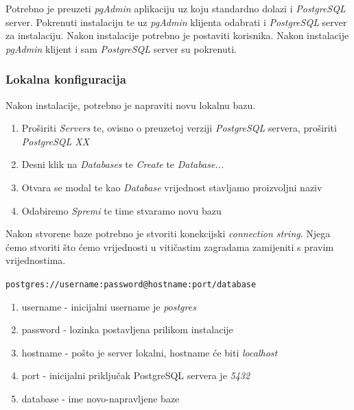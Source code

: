 								Potrebno je preuzeti \textit{pgAdmin} aplikaciju uz koju standardno dolazi i \textit{PostgreSQL} server. Pokrenuti instalaciju te uz \textit{pgAdmin} klijenta odabrati i \textit{PostgreSQL} server za instalaciju. Nakon instalacije potrebno je postaviti korisnika. Nakon instalacije \textit{pgAdmin} klijent i sam \textit{PostgreSQL} server su pokrenuti.
								
						\subsubsection*{Lokalna konfiguracija}
								
								Nakon instalacije, potrebno je napraviti novu lokalnu bazu.
								
								\begin{enumerate}
										\item Proširiti \textit{Servers} te, ovisno o preuzetoj verziji \textit{PostgreSQL} servera, proširiti  \textit{PostgreSQL XX}
										\item Desni klik na \textit{Databases} te \textit{Create} te \textit{Database...}
										\item Otvara se modal te kao \textit{Database} vrijednost stavljamo proizvoljni naziv
										\item Odabiremo \textit{Spremi} te time stvaramo novu bazu
								\end{enumerate}
								
								Nakon stvorene baze potrebno je stvoriti konekcijski \textit{connection string}. Njega ćemo stvoriti što ćemo vrijednosti u vitičastim zagradama zamijeniti s pravim vrijednostima.
								
								\begin{center}
										\texttt{postgres://{username}:{password}@{hostname}:{port}/{database}}
								\end{center}
								
								\begin{enumerate}
										\item username - inicijalni username je \textit{postgres}
										\item password - lozinka postavljena prilikom instalacije
										\item hostname - pošto je server lokalni, hostname će biti \textit{localhost}
										\item port - inicijalni priključak PostgreSQL servera je \textit{5432}
										\item database - ime novo-napravljene baze
								\end{enumerate}
								
